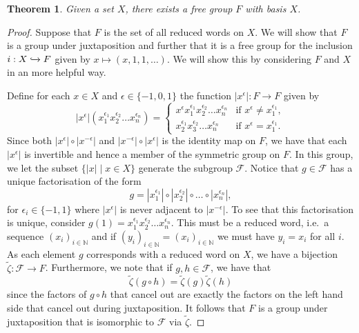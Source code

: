 \documentclass[12pt]{article}
\newtheorem{theorem}{Theorem}
\theoremstyle{definition}
\numberwithin{equation}{theorem}
\begin{document}
\begin{theorem}
  \label{thm:exist}
  Given a set $X$, there exists a free group $F$ with basis $X$.
\end{theorem}

\begin{proof}
  Suppose that $F$ is the set of all reduced words on $X$. We will show that $F$ is a group under juxtaposition and further that it is a free group for the inclusion $i:X \xhookrightarrow{} F$ given by $x \mapsto (x,1,1,\dots)$. We will show this by considering $F$ and $X$ in an more helpful way.
  
  Define for each $x \in X$ and $\epsilon \in \{-1,0,1 \}$ the function $|x^{\epsilon}|:F \rightarrow F$ given by
  \[
    |x^{\epsilon}|(x_1^{\epsilon_1}x_2^{\epsilon_2} \dots x_n^{\epsilon_n}) =
    \begin{cases}
      x^{\epsilon}x_1^{\epsilon_1}x_2^{\epsilon_2} \dots x_n^{\epsilon_n} & \text{if } x^{\epsilon} \neq x_1^{\epsilon_1}, \\
      x_2^{\epsilon_1}x_3^{\epsilon_2} \dots x_n^{\epsilon_n} & \text{if } x^{\epsilon} = x_1^{\epsilon_1}.
    \end{cases}
  \]
  Since both $|x^{\epsilon}| \circ |x^{-\epsilon}|$ and $|x^{-\epsilon}| \circ |x^{\epsilon}|$ is the identity map on $F$, we have that each $|x^{\epsilon}|$ is invertible and hence a member of the symmetric group on $F$. In this group, we let the subset $\{|x| \mid x \in X \}$ generate the subgroup $\mathcal{F}$. Notice that $g \in \mathcal{F}$ has a unique factorisation of the form
  \begin{equation*}
    g = |x_1^{\epsilon_1}| \circ |x_2^{\epsilon_2}| \circ \dots \circ |x_n^{\epsilon_n}|,
  \end{equation*}
  for $\epsilon_i \in \{-1,1 \}$ where $|x^{\epsilon}|$ is never adjacent to $|x^{-\epsilon}|$. To see that this factorisation is unique, consider $g(1) = x_1^{\epsilon_1} x_2^{\epsilon_2} \dots x_n^{\epsilon_n}$. This must be a reduced word, i.e.\ a sequence $(x_i)_{i \in \mathbb{N}}$ and if $(y_i)_{i \in \mathbb{N}} = (x_i)_{i \in \mathbb{N}}$ we must have $y_i = x_i$ for all $i$. As each element $g$ corresponds with a reduced word on $X$, we have a bijection $\tilde{\zeta}: \mathcal{F} \rightarrow F$. Furthermore, we note that if $g,h \in \mathcal{F}$, we have that
  \[
    \tilde{\zeta}(g \circ h) = \tilde{\zeta}(g)\tilde{\zeta}(h)
  \]
  since the factors of $g \circ h$ that cancel out are exactly the factors on the left hand side that cancel out during juxtaposition. It follows that $F$ is a group under juxtaposition that is isomorphic to $\mathcal{F}$ via $\tilde{\zeta}$.


\end{proof}
\end{document}
